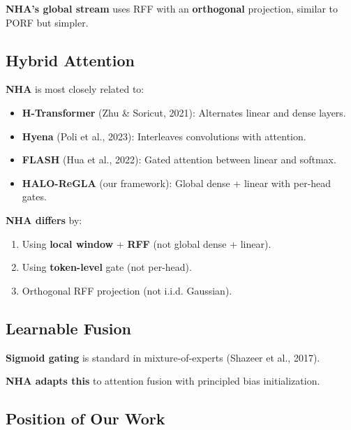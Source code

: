 \textbf{NHA's global stream} uses RFF with an \textbf{orthogonal} projection, similar 
to PORF but simpler.

\subsection{Hybrid Attention}

\textbf{NHA} is most closely related to:

\begin{itemize}
\item \textbf{H-Transformer} (Zhu \& Soricut, 2021): Alternates linear and dense layers.
\item \textbf{Hyena} (Poli et al., 2023): Interleaves convolutions with attention.
\item \textbf{FLASH} (Hua et al., 2022): Gated attention between linear and softmax.
\item \textbf{HALO-ReGLA} (our framework): Global dense + linear with per-head gates.

\end{itemize}
\textbf{NHA differs} by:
\begin{enumerate}
\item Using \textbf{local window} + \textbf{RFF} (not global dense + linear).
\item Using \textbf{token-level} gate (not per-head).
\item Orthogonal RFF projection (not i.i.d. Gaussian).

\end{enumerate}
\subsection{Learnable Fusion}

\textbf{Sigmoid gating} is standard in mixture-of-experts (Shazeer et al., 2017).

\textbf{NHA adapts this} to attention fusion with principled bias initialization.

\subsection{Position of Our Work}

